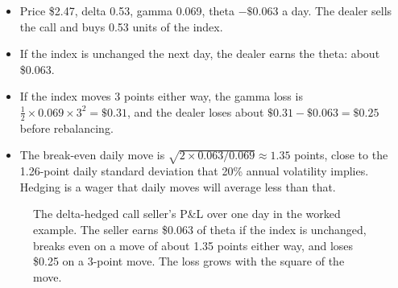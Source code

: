 \begin{itemize}
  \item Price \$2.47, delta 0.53, gamma 0.069, theta $-\$0.063$ a day. The dealer sells the call and buys 0.53 units of the index.
  \item If the index is unchanged the next day, the dealer earns the theta: about \$0.063.
  \item If the index moves 3 points either way, the gamma loss is $\tfrac{1}{2} \times 0.069 \times 3^2 = \$0.31$, and the dealer loses about $\$0.31 - \$0.063 = \$0.25$ before rebalancing.
  \item The break-even daily move is $\sqrt{2 \times 0.063/0.069} \approx 1.35$ points, close to the 1.26-point daily standard deviation that 20\% annual volatility implies. Hedging is a wager that daily moves will average less than that.
\end{itemize}

\begin{figure}[htbp]
\centering
{}
\caption{The delta-hedged call seller's P\&L over one day in the worked example. The seller earns \$0.063 of theta if the index is unchanged, breaks even on a move of about 1.35 points either way, and loses \$0.25 on a 3-point move. The loss grows with the square of the move.}
\label{fig:17-pnl}
\end{figure}

